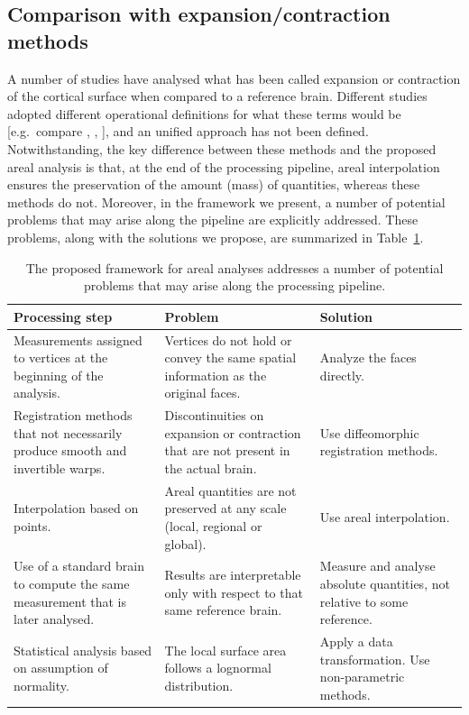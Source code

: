 \subsection{Comparison with expansion/contraction methods}

A number of studies have analysed what has been called expansion or contraction of the cortical surface when compared to a reference brain. Different studies adopted different operational definitions for what these terms would be [e.g.\ compare \citet{Joyner2009}, \citet{Sun2009}, \citet{Hill2010}], and an unified approach has not been defined. Notwithstanding, the key difference between these methods and the proposed areal analysis is that, at the end of the processing pipeline, areal interpolation ensures the preservation of the amount (mass) of quantities, whereas these methods do not. Moreover, in the framework we present, a number of potential problems that may arise along the pipeline are explicitly addressed. These problems, along with the solutions we propose, are summarized in Table~\ref{tab:compare}.

\begin{table}[!p]
\caption[Problems solved by the proposed method.]{The proposed framework for areal analyses addresses a number of potential problems that may arise along the processing pipeline.}
\begin{center}
{\small
\begin{tabular}{@{}m{42mm}<{\raggedright}m{44mm}<{\raggedright}m{43mm}<{\raggedright}@{}}
\toprule
Processing step &
Problem &
Solution \\
\midrule
Measurements assigned to vertices at the beginning of the analysis. &
Vertices do not hold or convey the same spatial information as the original faces. &
Analyze the faces directly. \\
\midrule
Registration methods that not necessarily produce smooth and invertible warps. &
Discontinuities on expansion or contraction that are not present in the actual brain. &
Use diffeomorphic registration methods. \\
\midrule
Interpolation based on points. &
Areal quantities are not preserved at any scale (local, regional or global). &
Use areal interpolation. \\
\midrule
Use of a standard brain to compute the same measurement that is later analysed. &
Results are interpretable only with respect to that same reference brain. &
Measure and analyse absolute quantities, not relative to some reference. \\
\midrule
Statistical analysis based on assumption of normality. &
The local surface area follows a lognormal distribution. &
Apply a data transformation. Use non-parametric methods. \\
\bottomrule
\end{tabular}}
\end{center}
\label{tab:compare}
\end{table}

